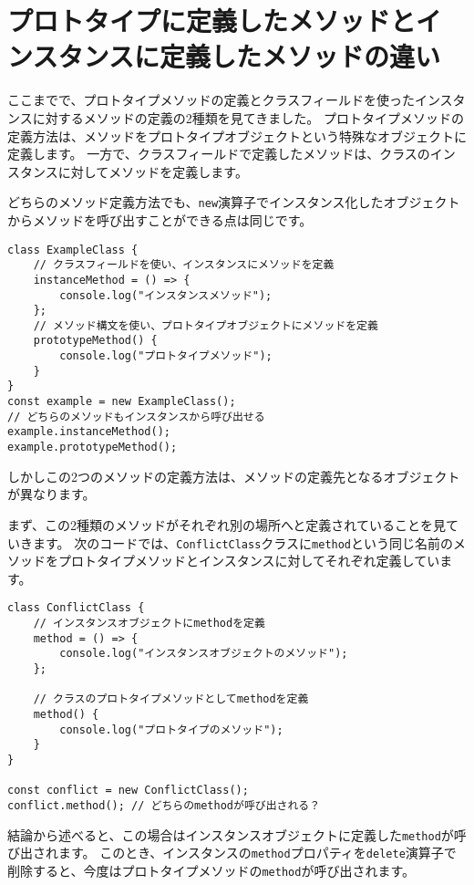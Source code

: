 \hypertarget{two-instance-method-definition}{%
\section{プロトタイプに定義したメソッドとインスタンスに定義したメソッドの違い}\label{two-instance-method-definition}}

ここまでで、プロトタイプメソッドの定義とクラスフィールドを使ったインスタンスに対するメソッドの定義の2種類を見てきました。
プロトタイプメソッドの定義方法は、メソッドをプロトタイプオブジェクトという特殊なオブジェクトに定義します。
一方で、クラスフィールドで定義したメソッドは、クラスのインスタンスに対してメソッドを定義します。

どちらのメソッド定義方法でも、\texttt{new}演算子でインスタンス化したオブジェクトからメソッドを呼び出すことができる点は同じです。

\begin{lstlisting}
class ExampleClass {
    // クラスフィールドを使い、インスタンスにメソッドを定義
    instanceMethod = () => {
        console.log("インスタンスメソッド");
    };
    // メソッド構文を使い、プロトタイプオブジェクトにメソッドを定義
    prototypeMethod() {
        console.log("プロトタイプメソッド");
    }
}
const example = new ExampleClass();
// どちらのメソッドもインスタンスから呼び出せる
example.instanceMethod();
example.prototypeMethod();
\end{lstlisting}

しかしこの2つのメソッドの定義方法は、メソッドの定義先となるオブジェクトが異なります。

まず、この2種類のメソッドがそれぞれ別の場所へと定義されていることを見ていきます。
次のコードでは、\texttt{ConflictClass}クラスに\texttt{method}という同じ名前のメソッドをプロトタイプメソッドとインスタンスに対してそれぞれ定義しています。
\newpage
\begin{lstlisting}
class ConflictClass {
    // インスタンスオブジェクトにmethodを定義
    method = () => {
        console.log("インスタンスオブジェクトのメソッド");
    };

    // クラスのプロトタイプメソッドとしてmethodを定義
    method() {
        console.log("プロトタイプのメソッド");
    }
}

const conflict = new ConflictClass();
conflict.method(); // どちらのmethodが呼び出される？
\end{lstlisting}

結論から述べると、この場合はインスタンスオブジェクトに定義した\texttt{method}が呼び出されます。
このとき、インスタンスの\texttt{method}プロパティを\texttt{delete}演算子で削除すると、今度はプロトタイプメソッドの\texttt{method}が呼び出されます。

